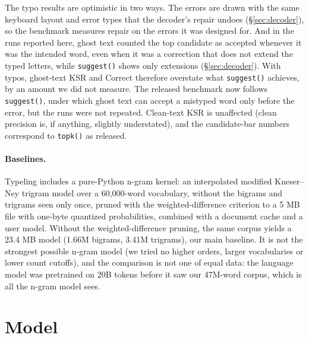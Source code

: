 \documentclass[11pt]{article}
\begin{document}
The typo results are optimistic in two ways. The errors are drawn with the same keyboard layout and error types that
the decoder's repair undoes (\S\ref{sec:decoder}), so the benchmark measures repair on the errors it was designed
for. And in the runs reported here, ghost text counted the top candidate as accepted whenever it was the intended
word, even when it was a correction that does not extend the typed letters, while \texttt{suggest()} shows only
extensions (\S\ref{sec:decoder}). With typos, ghost-text KSR and Correct therefore overstate what \texttt{suggest()}
achieves, by an amount we did not measure. The released benchmark now follows \texttt{suggest()}, under which ghost
text can accept a mistyped word only before the error, but the runs were not repeated. Clean-text KSR is unaffected
(clean precision is, if anything, slightly understated), and the candidate-bar numbers correspond to \texttt{topk()}
as released.

\paragraph{Baselines.} Typeling includes a pure-Python n-gram kernel: an interpolated modified Kneser--Ney trigram
model \citep{kneser-ney-1995-improved,chen-goodman-1999-empirical} over a 60,000-word vocabulary, without the bigrams
and trigrams seen only once, pruned with the weighted-difference criterion \citep{seymore-rosenfeld-1996-scalable} to
a 5 MB file with one-byte quantized probabilities, combined with a document cache and a user model. Without the
weighted-difference pruning, the same corpus yields a 23.4 MB model (1.66M bigrams, 3.41M trigrams), our main
baseline. It is not the strongest possible n-gram model (we tried no higher orders, larger vocabularies or lower
count cutoffs), and the comparison is not one of equal data: the language model was pretrained on 20B tokens before
it saw our 47M-word corpus, which is all the n-gram model sees.

\section{Model}
\label{sec:model}
\end{document}
